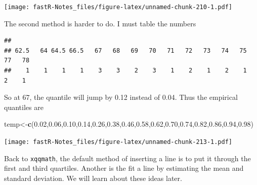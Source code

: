 \documentclass[]{book}
\newenvironment{Shaded}{\begin{snugshade}}{\end{snugshade}}
\newcommand{\KeywordTok}[1]{\textcolor[rgb]{0.13,0.29,0.53}{\textbf{#1}}}
\newcommand{\DataTypeTok}[1]{\textcolor[rgb]{0.13,0.29,0.53}{#1}}
\newcommand{\FloatTok}[1]{\textcolor[rgb]{0.00,0.00,0.81}{#1}}
\newcommand{\StringTok}[1]{\textcolor[rgb]{0.31,0.60,0.02}{#1}}
\newcommand{\OperatorTok}[1]{\textcolor[rgb]{0.81,0.36,0.00}{\textbf{#1}}}
\newcommand{\NormalTok}[1]{#1}
\theoremstyle{definition}
\theoremstyle{definition}
\theoremstyle{definition}
\theoremstyle{remark}
\begin{document}
\texttt{[image: fastR-Notes\_files/figure-latex/unnamed-chunk-210-1.pdf]}

The second method is harder to do. I must table the numbers

\begin{Shaded}
\end{Shaded}

\begin{verbatim}
## 
## 62.5   64 64.5 66.5   67   68   69   70   71   72   73   74   75   77   78 
##    1    1    1    1    3    3    2    3    1    2    1    2    1    2    1
\end{verbatim}

So at 67, the quantile will jump by 0.12 instead of 0.04. Thus the
empirical quantiles are

\begin{Shaded}
\begin{Highlighting}[]
\NormalTok{temp<-}\KeywordTok{c}\NormalTok{(}\FloatTok{0.02}\NormalTok{,}\FloatTok{0.06}\NormalTok{,}\FloatTok{0.10}\NormalTok{,}\FloatTok{0.14}\NormalTok{,}\FloatTok{0.26}\NormalTok{,}\FloatTok{0.38}\NormalTok{,}\FloatTok{0.46}\NormalTok{,}\FloatTok{0.58}\NormalTok{,}\FloatTok{0.62}\NormalTok{,}\FloatTok{0.70}\NormalTok{,}\FloatTok{0.74}\NormalTok{,}\FloatTok{0.82}\NormalTok{,}\FloatTok{0.86}\NormalTok{,}\FloatTok{0.94}\NormalTok{,}\FloatTok{0.98}\NormalTok{)}
\end{Highlighting}
\end{Shaded}

\begin{Shaded}
\end{Shaded}

\texttt{[image: fastR-Notes\_files/figure-latex/unnamed-chunk-213-1.pdf]}

Back to \texttt{xqqmath}, the default method of inserting a line is to
put it through the first and third quartiles. Another is the fit a line
by estimating the mean and standard deviation. We will learn about these
ideas later.
\end{document}
